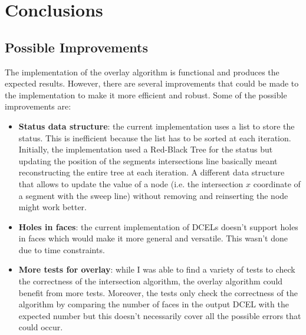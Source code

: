 \section{Conclusions}
\subsection{Possible Improvements}
The implementation of the overlay algorithm is functional and produces the expected results. However, there are several improvements that could be made to the implementation to make it more efficient and robust. Some of the possible improvements are:
\begin{itemize}
    \item \textbf{Status data structure}: the current implementation uses a list to store the status. This is inefficient because the list has to be sorted at each iteration. Initially, the implementation used a Red-Black Tree for the status but updating the position of the segments intersections line basically meant reconstructing the entire tree at each iteration. A different data structure that allows to update the value of a node (i.e. the intersection $x$ coordinate of a segment with the sweep line) without removing and reinserting the node might work better.
    \item \textbf{Holes in faces}: the current implementation of DCELs doesn't support holes in faces which would make it more general and versatile. This wasn't done due to time constraints.
    \item \textbf{More tests for overlay}: while I was able to find a variety of tests to check the correctness of the intersection algorithm, the overlay algorithm could benefit from more tests. Moreover, the tests only check the correctness of the algorithm by comparing the number of faces in the output DCEL with the expected number but this doesn't necessarily cover all the possible errors that could occur.
\end{itemize}
